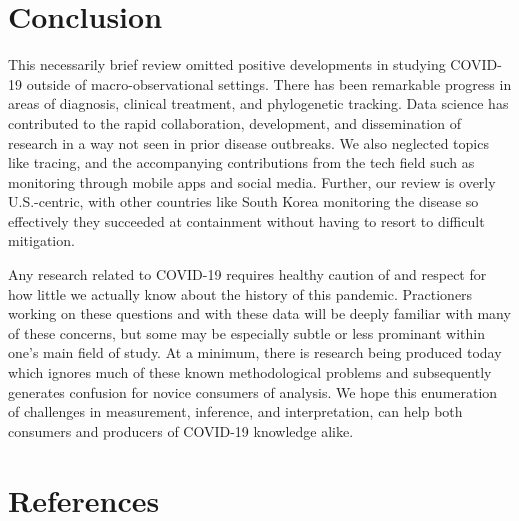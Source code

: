 \documentclass[
]{article}
\begin{document}
\hypertarget{conclusion}{%
\section{Conclusion}\label{conclusion}}

This necessarily brief review omitted positive developments in studying
COVID-19 outside of macro-observational settings. There has been
remarkable progress in areas of diagnosis, clinical treatment, and
phylogenetic tracking. Data science has contributed to the rapid
collaboration, development, and dissemination of research in a way not
seen in prior disease outbreaks. We also neglected topics like tracing,
and the accompanying contributions from the tech field such as
monitoring through mobile apps and social media. Further, our review is
overly U.S.-centric, with other countries like South Korea monitoring
the disease so effectively they succeeded at containment without having
to resort to difficult mitigation.

Any research related to COVID-19 requires healthy caution of and respect
for how little we actually know about the history of this pandemic.
Practioners working on these questions and with these data will be
deeply familiar with many of these concerns, but some may be especially
subtle or less prominant within one's main field of study. At a minimum,
there is research being produced today which ignores much of these known
methodological problems and subsequently generates confusion for novice
consumers of analysis. We hope this enumeration of challenges in
measurement, inference, and interpretation, can help both consumers and
producers of COVID-19 knowledge alike.

\hypertarget{references}{%
\section{References}\label{references}}
\end{document}
